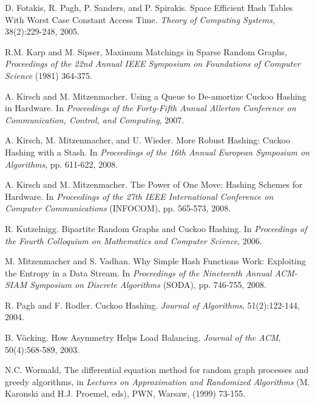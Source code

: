 \documentclass[11pt]{article}
\begin{document}
\begin{thebibliography}{100}
 D. Fotakis, R. Pagh, P. Sanders, and P. Spirakis.
    Space Efficient Hash Tables With Worst Case Constant Access Time.
    \emph{Theory of Computing Systems}, 38(2):229-248, 2005.

 R.M. Karp and M. Sipser, Maximum Matchings in Sparse Random Graphs,
{\em Proceedings of the 22nd Annual IEEE Symposium on Foundations of Computer Science} (1981) 364-375.


 A. Kirsch and M. Mitzenmacher. Using a Queue to
    De-amortize Cuckoo Hashing in Hardware. In \emph{Proceedings of the
    Forty-Fifth Annual Allerton Conference on Communication, Control, and
    Computing}, 2007.

 A. Kirsch, M. Mitzenmacher, and U. Wieder.  More
    Robust Hashing: Cuckoo Hashing with a Stash.  In
    \emph{Proceedings of the 16th Annual European Symposium on
    Algorithms}, pp. 611-622, 2008.

 A. Kirsch and M. Mitzenmacher. The Power of One
    Move: Hashing Schemes for Hardware. In \emph{Proceedings of the
    27th IEEE International Conference on Computer Communications}
    (INFOCOM), pp. 565-573, 2008.

 R. Kutzelnigg.  Bipartite Random Graphs and Cuckoo
    Hashing. In \emph{Proceedings of the Fourth Colloquium on
    Mathematics and Computer Science}, 2006.

 M. Mitzenmacher and S. Vadhan. Why Simple Hash
    Functions Work: Exploiting the Entropy in a Data Stream. In
    \emph{Proceedings of the Nineteenth Annual ACM-SIAM Symposium on
    Discrete Algorithms} (SODA), pp. 746-755, 2008.

 R. Pagh and F. Rodler. Cuckoo Hashing. \emph{Journal
    of Algorithms}, 51(2):122-144, 2004.

 B. V\"{o}cking.  How Asymmetry Helps Load Balancing.
    \emph{Journal of the ACM}, 50(4):568-589, 2003.

 N.C. Wormald, The differential equation method for random graph processes and greedy algorithms,
in  {\em Lectures on Approximation and Randomized Algorithms} (M. Karonski and H.J. Proemel, eds), PWN, Warsaw, (1999) 73-155.

\end{thebibliography}
\end{document}
